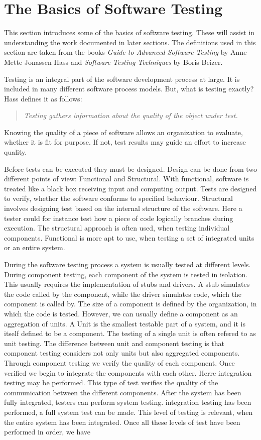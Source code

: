 \section{The Basics of Software Testing}\label{sect:btesting}
This section introduces some of the basics of software testing. These will assist in understanding the work documented in later sections. The definitions used in this section are taken from the books \textit{Guide to Advanced Software Testing} by Anne Mette Jonassen Hass\cite{Hass} and \textit{Software Testing Techniques} by Boris Beizer\cite{Beizer}.

Testing is an integral part of the software development process at large. It is included in many different software process models. But, what is testing exactly? Hass defines it as follows: 
 \begin{quotation} \textit{Testing gathers information about the quality of the object under test.}\end{quotation}  
Knowing the quality of a piece of software allows an organization to evaluate, whether it is fit for purpose. If not, test results may guide an effort to increase quality.

Before tests can be executed they must be designed.  Design can be done from two different points of view: Functional and Structural. With functional, software is treated like a black box receiving input and computing output. Tests are designed to verify, whether the software conforms to specified behaviour. Structural involves designing test based on the internal structure of the software. Here a tester could for instance test how a piece of code logically branches during execution. The structural approach is often used, when testing individual components. Functional is more apt to use, when testing a set of integrated units or an entire system. 

During the software testing process a system is usually tested at different levels. During component testing, each component of the system is tested in isolation. This usually requires the implementation of stubs and drivers. A stub simulates the code called by the component, while the driver simulates code, which the component is called by. The size of a component is defined by the organization, in which the code is tested. However, we can usually define a component as an aggregation of units. A Unit is the smallest testable part of a system, and it is itself defined to be a component. The testing of a single unit is often refered to as unit testing. The difference between unit and component testing is that component testing considers not only units but also aggregated components. Through component testing we verify the quality of each component. Once verified we begin to integrate the components with each other. Herre integration testing may be performed. This type of test verifies the quality of the communication between the different components. After the system has been fully integrated, testers can perform system testing.  integration testing has been performed, a full system test can be made. This level of testing is relevant, when the entire system has been integrated. Once all these levels of test have been performed in order, we have 

